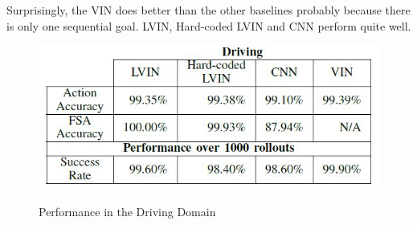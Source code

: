 \documentclass[letterpaper, 10 pt, conference]{ieeeconf}  %
\begin{document}
Surprisingly, the VIN does better than the other baselines probably because there is only one sequential goal. LVIN, Hard-coded LVIN and CNN perform quite well.
\begin{figure}[h]
 \centering
 \includegraphics[scale=.6]{DrivingResults.JPG}\\
 \caption{Performance in the Driving Domain}
\end{figure}
\end{document}
